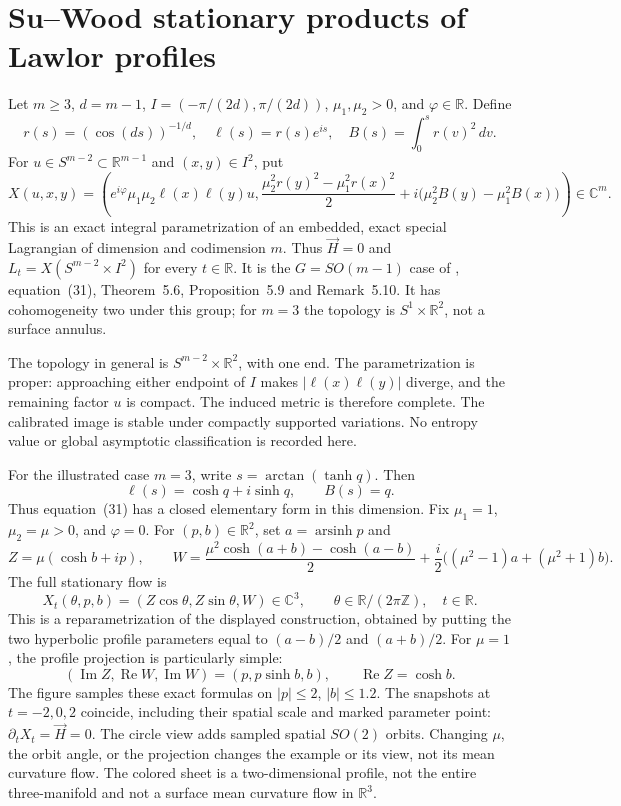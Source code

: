 \chapter{Su--Wood stationary products of Lawlor profiles}\label{sec:catalogue-su-wood-stationary}
\begin{example}\label{ex:catalogue-su-wood-stationary}
Let $m\geq3$, $d=m-1$, $I=(-\pi/(2d),\pi/(2d))$, $\mu_1,\mu_2>0$, and $\varphi\in\mathbb R$. Define
\[
 r(s)=(\cos(ds))^{-1/d},\quad \ell(s)=r(s)e^{is},\quad
 B(s)=\int_0^s r(v)^2\,dv.
\]
For $u\in S^{m-2}\subset\mathbb R^{m-1}$ and $(x,y)\in I^2$, put
\[
 X(u,x,y)=\left(e^{i\varphi}\mu_1\mu_2\ell(x)\ell(y)u,
 \frac{\mu_2^2r(y)^2-\mu_1^2r(x)^2}{2}
 +i\bigl(\mu_2^2B(y)-\mu_1^2B(x)\bigr)\right)\in\mathbb C^m.
\]
This is an exact integral parametrization of an embedded, exact special Lagrangian of dimension and codimension $m$. Thus $\vec H=0$ and $L_t=X(S^{m-2}\times I^2)$ for every $t\in\mathbb R$. It is the $G=SO(m-1)$ case of \cite{CatSuWood2026}, equation~(31), Theorem~5.6, Proposition~5.9 and Remark~5.10. It has cohomogeneity two under this group; for $m=3$ the topology is $S^1\times\mathbb R^2$, not a surface annulus.

The topology in general is $S^{m-2}\times\mathbb R^2$, with one end. The parametrization is proper: approaching either endpoint of $I$ makes $|\ell(x)\ell(y)|$ diverge, and the remaining factor $u$ is compact. The induced metric is therefore complete. The calibrated image is stable under compactly supported variations. No entropy value or global asymptotic classification is recorded here.


For the illustrated case $m=3$, write $s=\arctan(\tanh q)$. Then
\[
 \ell(s)=\cosh q+i\sinh q,\qquad B(s)=q.
\]
Thus equation~(31) has a closed elementary form in this dimension. Fix
$\mu_1=1$, $\mu_2=\mu>0$, and $\varphi=0$. For $(p,b)\in\mathbb R^2$,
set $a=\operatorname{arsinh}p$ and
\[
 Z=\mu(\cosh b+ip),\qquad
 W=\frac{\mu^2\cosh(a+b)-\cosh(a-b)}2
   +\frac{i}{2}\bigl((\mu^2-1)a+(\mu^2+1)b\bigr).
\]
The full stationary flow is
\[
 X_t(\theta,p,b)=(Z\cos\theta,Z\sin\theta,W)\in\mathbb C^3,
 \qquad \theta\in\mathbb R/(2\pi\mathbb Z),\quad t\in\mathbb R.
\]
This is a reparametrization of the displayed construction, obtained by putting
the two hyperbolic profile parameters equal to $(a-b)/2$ and $(a+b)/2$.
For $\mu=1$, the profile projection is particularly simple:
\[
 (\operatorname{Im}Z,\operatorname{Re}W,\operatorname{Im}W)
       =(p,p\sinh b,b),\qquad \operatorname{Re}Z=\cosh b.
\]
The figure samples these exact formulas on $|p|\leq2$, $|b|\leq1.2$.
The snapshots at $t=-2,0,2$ coincide, including their spatial scale and
marked parameter point: $\partial_tX_t=\vec H=0$. The circle view adds
sampled spatial $SO(2)$ orbits. Changing $\mu$, the orbit angle, or the
projection changes the example or its view, not its mean curvature flow.
The colored sheet is a two-dimensional profile, not the entire
three-manifold and not a surface mean curvature flow in $\mathbb R^3$.


\end{example}
